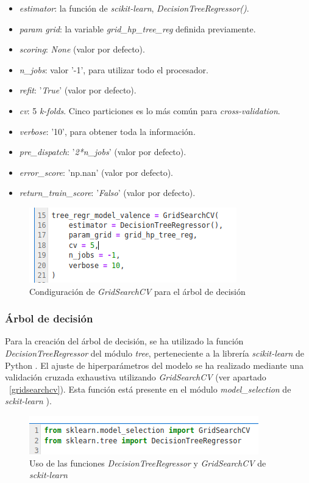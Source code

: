 \documentclass[12pt,a4paper,Spanish]{article}
\begin{document}
\begin{itemize}
	\item \textit{estimator}: la función de \textit{scikit-learn}, \textit{DecisionTreeRegressor()}.
	\item \textit{param grid}: la variable \textit{grid\_hp\_tree\_reg} definida previamente.
	\item \textit{scoring}: \textit{None} (valor por defecto).
	\item \textit{n\_jobs}: valor '-1', para utilizar todo el procesador.
	\item \textit{refit}: '\textit{True}' (valor por defecto).
	\item \textit{cv}: 5 \textit{k-folds}. Cinco particiones es lo más común para \textit{cross-validation}.
	\item \textit{verbose}: '10', para obtener toda la información.
	\item \textit{pre\_dispatch}: '\textit{2*n\_jobs}' (valor por defecto).
	\item \textit{error\_score}: 'np.nan' (valor por defecto).
	\item \textit{return\_train\_score}: '\textit{Falso}' (valor por defecto).
\end{itemize}
\begin{figure}[H]
	\centering
	\includegraphics[width=0.7\linewidth]{figs/cv_tree}
	\caption{Condiguración de \textit{GridSearchCV} para el árbol de decisión}
	\label{fig:cvtree}
\end{figure}



\subsubsection{Árbol de decisión}
Para la creación del árbol de decisión, se ha utilizado la función \textit{DecisionTreeRegressor} del módulo \textit{tree}, perteneciente a la librería \textit{scikit-learn} de Python \cite{scikit-learn}.
\newline
El ajuste de hiperparámetros del modelo se ha realizado mediante una validación cruzada exhaustiva utilizando \textit{GridSearchCV} (ver apartado ~\ref{gridsearchcv}). Esta función está presente en el módulo \textit{model\_selection} de \textit{sckit-learn} \cite{scikit-learn}).
\begin{figure}[H]
	\centering
	\includegraphics[width=0.7\linewidth]{figs/import_tree}
	\caption{Uso de las funciones \textit{DecisionTreeRegressor} y \textit{GridSearchCV} de \textit{sckit-learn}}
	\label{fig:importtree}
\end{figure}
\end{document}
